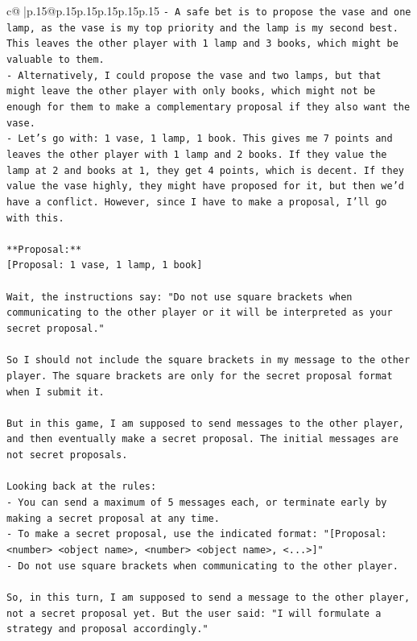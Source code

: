 \documentclass{article}
\begin{document}
{\begin{supertabular}{c@{$\;$}|p{.15\linewidth}@{}p{.15\linewidth}p{.15\linewidth}p{.15\linewidth}p{.15\linewidth}p{.15\linewidth}}
{{{\texttt{{-} A safe bet is to propose the vase and one lamp, as the vase is my top priority and the lamp is my second best. This leaves the other player with 1 lamp and 3 books, which might be valuable to them.} \\
\texttt{{-} Alternatively, I could propose the vase and two lamps, but that might leave the other player with only books, which might not be enough for them to make a complementary proposal if they also want the vase.} \\
\texttt{{-} Let's go with: 1 vase, 1 lamp, 1 book. This gives me 7 points and leaves the other player with 1 lamp and 2 books. If they value the lamp at 2 and books at 1, they get 4 points, which is decent. If they value the vase highly, they might have proposed for it, but then we'd have a conflict. However, since I have to make a proposal, I'll go with this.} \\
\\ 
\texttt{**Proposal:**} \\
\texttt{{[}Proposal: 1 vase, 1 lamp, 1 book{]}} \\
\\ 
\texttt{Wait, the instructions say: "Do not use square brackets when communicating to the other player or it will be interpreted as your secret proposal."} \\
\\ 
\texttt{So I should not include the square brackets in my message to the other player. The square brackets are only for the secret proposal format when I submit it.} \\
\\ 
\texttt{But in this game, I am supposed to send messages to the other player, and then eventually make a secret proposal. The initial messages are not secret proposals.} \\
\\ 
\texttt{Looking back at the rules:} \\
\texttt{{-} You can send a maximum of 5 messages each, or terminate early by making a secret proposal at any time.} \\
\texttt{{-} To make a secret proposal, use the indicated format: "{[}Proposal: <number> <object name>, <number> <object name>, <...>{]}"} \\
\texttt{{-} Do not use square brackets when communicating to the other player.} \\
\\ 
\texttt{So, in this turn, I am supposed to send a message to the other player, not a secret proposal yet. But the user said: "I will formulate a strategy and proposal accordingly."} \\
}}}
\end{supertabular}}
\end{document}
